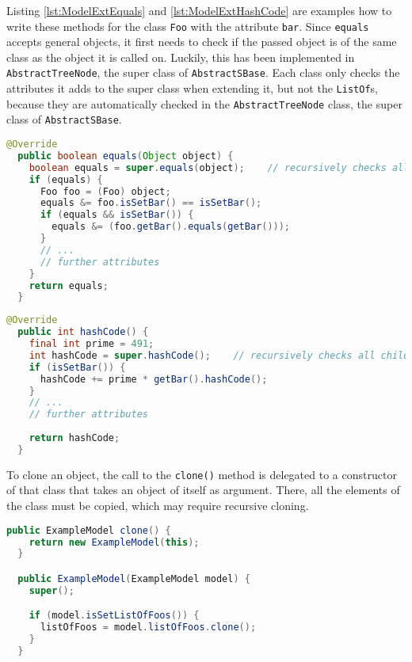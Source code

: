 Listing \ref{lst:ModelExtEquals} and \ref{lst:ModelExtHashCode} are examples how to write these methods for the class \texttt{Foo} with the attribute \texttt{bar}.
Since \texttt{equals} accepts general objects, it first needs to check if the passed object is of the same class as the object it is called on.
Luckily, this has been implemented in \texttt{AbstractTreeNode}, the super class of \texttt{AbstractSBase}.
Each class only checks the attributes it adds to the super class when extending it, but not the \texttt{ListOf}s,
because they are automatically checked in the \texttt{AbstractTreeNode} class, the super class of \texttt{AbstractSBase}.

\begin{lstlisting}[language=Java,caption={Example of the \texttt{equals} method},label={lst:ModelExtEquals}]
@Override
  public boolean equals(Object object) {
    boolean equals = super.equals(object);    // recursively checks all children
    if (equals) {
      Foo foo = (Foo) object;
      equals &= foo.isSetBar() == isSetBar();
      if (equals && isSetBar()) {
        equals &= (foo.getBar().equals(getBar()));
      }
      // ...
      // further attributes
    }
    return equals;
  }
\end{lstlisting}


\begin{lstlisting}[language=Java,caption={Example of the \texttt{hashCode} method. The variable \texttt{prime} should be a big prime number to prevent collisions},label={lst:ModelExtHashCode}]
  @Override
  public int hashCode() {
    final int prime = 491;
    int hashCode = super.hashCode();    // recursively checks all children
    if (isSetBar()) {
      hashCode += prime * getBar().hashCode();
    }
    // ...
    // further attributes
    
    return hashCode;
  }
\end{lstlisting}

To clone an object, the call to the \texttt{clone()} method is delegated to a constructor of that class that takes an object of itself as argument.
There, all the elements of the class must be copied, which may require recursive cloning.

\begin{lstlisting}[language=Java,caption={Example of the \texttt{clone} method for the \texttt{ExampleModel} class},label={lst:ModelExtClone}]
  public ExampleModel clone() {
    return new ExampleModel(this);
  }

  public ExampleModel(ExampleModel model) {
    super();

    if (model.isSetListOfFoos()) {
      listOfFoos = model.listOfFoos.clone();
    }
  }
\end{lstlisting}

